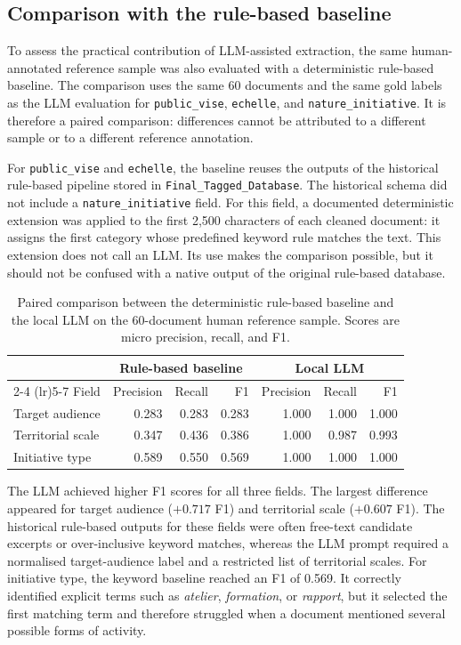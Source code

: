 \subsection{Comparison with the rule-based baseline}

To assess the practical contribution of LLM-assisted extraction, the same
human-annotated reference sample was also evaluated with a deterministic
rule-based baseline. The comparison uses the same 60 documents and the same
gold labels as the LLM evaluation for \texttt{public\_vise},
\texttt{echelle}, and \texttt{nature\_initiative}. It is therefore a paired
comparison: differences cannot be attributed to a different sample or to a
different reference annotation.

For \texttt{public\_vise} and \texttt{echelle}, the baseline reuses the
outputs of the historical rule-based pipeline stored in
\texttt{Final\_Tagged\_Database}. The historical schema did not include a
\texttt{nature\_initiative} field. For this field, a documented deterministic
extension was applied to the first 2,500 characters of each cleaned document:
it assigns the first category whose predefined keyword rule matches the text.
This extension does not call an LLM. Its use makes the comparison possible,
but it should not be confused with a native output of the original rule-based
database.

\begin{table}[H]
\centering
\small
\begin{tabular}{lrrrrrr}
\toprule
& \multicolumn{3}{c}{Rule-based baseline} & \multicolumn{3}{c}{Local LLM} \\
\cmidrule(lr){2-4} \cmidrule(lr){5-7}
Field & Precision & Recall & F1 & Precision & Recall & F1 \\
\midrule
Target audience & 0.283 & 0.283 & 0.283 & 1.000 & 1.000 & 1.000 \\
Territorial scale & 0.347 & 0.436 & 0.386 & 1.000 & 0.987 & 0.993 \\
Initiative type & 0.589 & 0.550 & 0.569 & 1.000 & 1.000 & 1.000 \\
\bottomrule
\end{tabular}
\caption{Paired comparison between the deterministic rule-based baseline and
the local LLM on the 60-document human reference sample. Scores are micro
precision, recall, and F1.}
\label{tab:rule-based-llm-comparison}
\end{table}

The LLM achieved higher F1 scores for all three fields. The largest difference
appeared for target audience ($+0.717$ F1) and territorial scale ($+0.607$ F1).
The historical rule-based outputs for these fields were often free-text
candidate excerpts or over-inclusive keyword matches, whereas the LLM prompt
required a normalised target-audience label and a restricted list of territorial
scales. For initiative type, the keyword baseline reached an F1 of 0.569. It
correctly identified explicit terms such as \textit{atelier}, \textit{formation},
or \textit{rapport}, but it selected the first matching term and therefore
struggled when a document mentioned several possible forms of activity.

